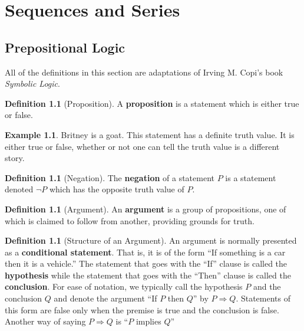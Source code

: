 \documentclass[letterpaper, twoside, 12pt]{book}
\theoremstyle{definition}
\theoremstyle{definition}
\newtheorem{definition}[theorem]{Definition}
\newtheorem{example}[theorem]{Example}
\begin{document}
\setcounter{chapter}{10}
\chapter{Sequences and Series}

\setcounter{section}{-1}
\section{Prepositional Logic}
All of the definitions in this section are adaptations of Irving M. Copi's book \emph{Symbolic Logic}.

\begin{definition}[Proposition]
 A \textbf{proposition} is a statement which is either true or false.
\end{definition}

\begin{example}
 Britney is a goat.  This statement has a definite truth value.  It is either true or false, whether or not one can tell the truth value is a different story.
\end{example}

\begin{definition}[Negation]
 The \textbf{negation} of a statement $P$ is a statement denoted $\neg P$ which has the opposite truth value of $P$.
\end{definition}

\begin{definition}[Argument]
 An \textbf{argument} is a group of propositions, one of which is claimed to follow from another, providing grounds for truth.
\end{definition}

\begin{definition}[Structure of an Argument]
 An argument is normally presented as a \textbf{conditional statement}.  That is, it is of the form ``If something is a car then it is a vehicle.''  The statement that goes with the ``If'' clause is called the \textbf{hypothesis} while the statement that goes with the ``Then'' clause is called the \textbf{conclusion}.  For ease of notation, we typically call the hypothesis $P$ and the conclusion $Q$ and denote the argument ``If $P$ then $Q$'' by $P \Rightarrow Q$.  Statements of this form are false only when the premise is true and the conclusion is false.  Another way of saying $P \Rightarrow Q$ is ``$P$ implies $Q$''
\end{definition}
\end{document}
